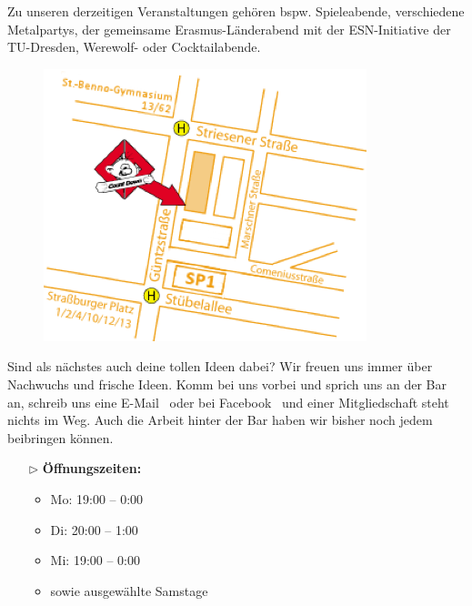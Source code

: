Zu unseren derzeitigen Veranstaltungen gehören bspw. Spieleabende, verschiedene Metalpartys, der gemeinsame Erasmus-Länderabend mit der ESN-Initiative der TU-Dresden, Werewolf- oder Cocktailabende.

\pagebreak

\begin{figure}%
  \includegraphics[width=\linewidth]{img/cd-anfahrt}
  \vspace{-1cm}
\end{figure}

Sind als nächstes auch deine tollen Ideen dabei?
Wir freuen uns immer über Nachwuchs und frische Ideen.
Komm bei uns vorbei und sprich uns an der Bar an, schreib uns eine E-Mail~ oder bei Facebook~ und einer Mitgliedschaft steht nichts im Weg.
Auch die Arbeit hinter der Bar haben wir bisher noch jedem beibringen können.

\begin{itemize}
    \item[$\rhd$] \textbf{Öffnungszeiten:}
    \begin{itemize}[noitemsep]
        \item Mo: 19:00 – 0:00
        \item Di: 20:00 – 1:00
        \item Mi: 19:00 – 0:00
        \item sowie ausgewählte Samstage
    \end{itemize}
\end{itemize}

